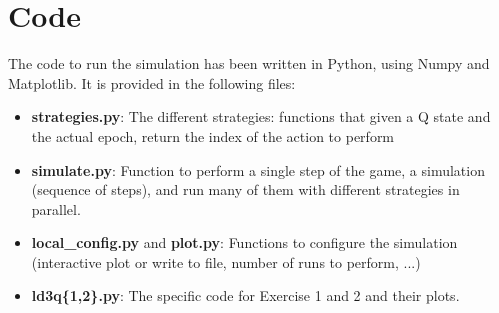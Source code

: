 \documentclass[a4paper,11pt]{article}
\begin{document}
\section{Code}
The code to run the simulation has been written in Python, using Numpy and Matplotlib. It is provided in the following files:

\begin{itemize}
  \item \textbf{strategies.py}: The different strategies: functions that given a Q state and the actual epoch, return the index of the action to perform
  \item \textbf{simulate.py}: Function to perform a single step of the game, a simulation (sequence of steps), and run many of them with different strategies in parallel.
  \item \textbf{local\_config.py} and \textbf{plot.py}: Functions to configure the simulation (interactive plot or write to file, number of runs to perform, ...)
  \item \textbf{ld3q\{1,2\}.py}: The specific code for Exercise 1 and 2 and their plots.
\end{itemize}


\end{document}
